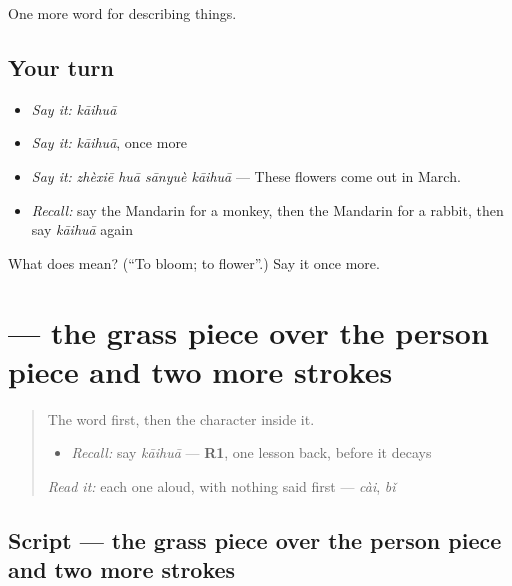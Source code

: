 \begin{grammarlens}[title={What you've built}]
One more word for describing things.
\end{grammarlens}

\subsection*{Your turn}
\begin{itemize}
\raggedright
  \item \emph{Say it:} \emph{kāihuā}
  \item \emph{Say it:} \emph{kāihuā}, once more
  \item \emph{Say it:} \emph{zhèxiē huā sānyuè kāihuā} — These flowers come out in March.
  \item \emph{Recall:} say the Mandarin for a monkey, then the Mandarin for a rabbit, then say \emph{kāihuā} again
\end{itemize}

\begin{tcolorbox}[breakable,colback=teal!4,colframe=teal!35!black,title={Before you move on}]
What does  mean? (\textquotedblleft{}To bloom; to flower\textquotedblright{}.) Say it once more.
\end{tcolorbox}
\section[\texorpdfstring{\zh{花} (huā)}{花 (huā)}]{ — the grass piece over the person piece and two more strokes}

\label{lesson:ZH-W224-hua-flower}



\begin{quote}
The word first, then the character inside it.

\begin{itemize}
\raggedright
  \item \emph{Recall:} say \emph{kāihuā} — \textbf{R1}, one lesson back, before it decays
\end{itemize}

\begin{quote}
 
\end{quote}

\emph{Read it:} each one aloud, with nothing said first — \emph{cài}, \emph{bǐ}
\end{quote}

\subsection*{Script — the grass piece over the person piece and two more strokes}


